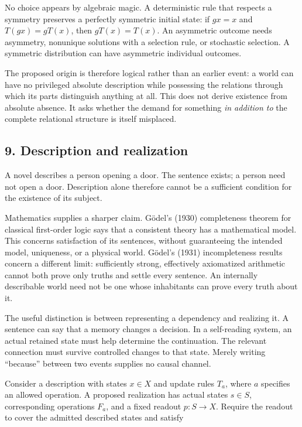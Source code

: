\documentclass[
  11pt,
]{article}
\begin{document}
No choice appears by algebraic magic. A deterministic rule that respects
a symmetry preserves a perfectly symmetric initial state: if \(gx=x\)
and \(T(gx)=gT(x)\), then \(gT(x)=T(x)\). An asymmetric outcome needs
asymmetry, nonunique solutions with a selection rule, or stochastic
selection. A symmetric distribution can have asymmetric individual
outcomes.

The proposed origin is therefore logical rather than an earlier event: a
world can have no privileged absolute description while possessing the
relations through which its parts distinguish anything at all. This does
not derive existence from absolute absence. It asks whether the demand
for something \emph{in addition to} the complete relational structure is
itself misplaced.

\subsection{9. Description and
realization}\label{description-and-realization}

A novel describes a person opening a door. The sentence exists; a person
need not open a door. Description alone therefore cannot be a sufficient
condition for the existence of its subject.

Mathematics supplies a sharper claim. Gödel's (1930) completeness
theorem for classical first-order logic says that a consistent theory
has a mathematical model. This concerns satisfaction of its sentences,
without guaranteeing the intended model, uniqueness, or a physical
world. Gödel's (1931) incompleteness results concern a different limit:
sufficiently strong, effectively axiomatized arithmetic cannot both
prove only truths and settle every sentence. An internally describable
world need not be one whose inhabitants can prove every truth about it.

The useful distinction is between representing a dependency and
realizing it. A sentence can say that a memory changes a decision. In a
self-reading system, an actual retained state must help determine the
continuation. The relevant connection must survive controlled changes to
that state. Merely writing ``because'' between two events supplies no
causal channel.

Consider a description with states \(x\in X\) and update rules \(T_a\),
where \(a\) specifies an allowed operation. A proposed realization has
actual states \(s\in S\), corresponding operations \(F_a\), and a fixed
readout \(p:S\to X\). Require the readout to cover the admitted
described states and satisfy
\end{document}
